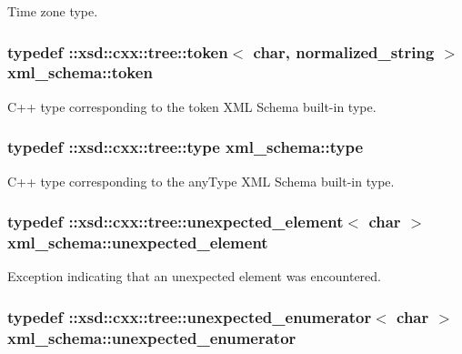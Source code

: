 Time zone type. 

\hypertarget{namespacexml__schema_abdb824cb755f58704a95b28f017dd0f7}{
\subsubsection[{token}]{\setlength{\rightskip}{0pt plus 5cm}typedef \-::xsd\-::cxx\-::tree\-::token$<$ char, {\bf normalized\-\_\-string} $>$ {\bf xml\-\_\-schema\-::token}}}\label{namespacexml__schema_abdb824cb755f58704a95b28f017dd0f7}


C++ type corresponding to the token X\-M\-L Schema built-\/in type. 

\hypertarget{namespacexml__schema_a3d277dc807f2e4ec4261dcef5c04a836}{
\subsubsection[{type}]{\setlength{\rightskip}{0pt plus 5cm}typedef \-::xsd\-::cxx\-::tree\-::type {\bf xml\-\_\-schema\-::type}}}\label{namespacexml__schema_a3d277dc807f2e4ec4261dcef5c04a836}


C++ type corresponding to the any\-Type X\-M\-L Schema built-\/in type. 

\hypertarget{namespacexml__schema_a55835ab195e4c70bc05de5bbac871110}{
\subsubsection[{unexpected\-\_\-element}]{\setlength{\rightskip}{0pt plus 5cm}typedef \-::xsd\-::cxx\-::tree\-::unexpected\-\_\-element$<$ char $>$ {\bf xml\-\_\-schema\-::unexpected\-\_\-element}}}\label{namespacexml__schema_a55835ab195e4c70bc05de5bbac871110}


Exception indicating that an unexpected element was encountered. 

\hypertarget{namespacexml__schema_aa088274f605e06cd53d9062265b5229c}{
\subsubsection[{unexpected\-\_\-enumerator}]{\setlength{\rightskip}{0pt plus 5cm}typedef \-::xsd\-::cxx\-::tree\-::unexpected\-\_\-enumerator$<$ char $>$ {\bf xml\-\_\-schema\-::unexpected\-\_\-enumerator}}}\label{namespacexml__schema_aa088274f605e06cd53d9062265b5229c}


